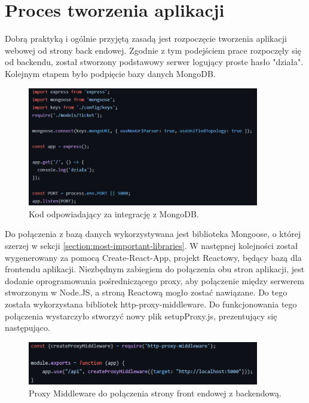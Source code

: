 \documentclass[12pt]{article}
\begin{document}
\begin{sloppypar}
\section{Proces tworzenia aplikacji}
{
  Dobrą praktyką i ogólnie przyjętą zasadą jest rozpoczęcie tworzenia aplikacji webowej od strony back endowej. Zgodnie z tym podejściem prace rozpoczęły się od backendu, 
  został stworzony podstawowy serwer logujący proste hasło "działa". Kolejnym etapem było podpięcie bazy danych MongoDB.
  \begin{figure}[H]
    \centering
    \includegraphics[width=0.9\textwidth]{Creation_process/DB_connected.PNG}
    \caption{Kod odpowiadający za integrację z MongoDB.}
    \label{fig:MongoDB-integration}
  \end{figure}
  Do połączenia z bazą danych wykorzystywana jest biblioteka Mongoose, o której szerzej w sekcji \ref{section:most-important-libraries}.
  W następnej kolejności został wygenerowany za pomocą Create-React-App, projekt Reactowy, będący bazą dla frontendu aplikacji. 
  Niezbędnym zabiegiem do połączenia obu stron aplikacji, jest dodanie oprogramowania pośredniczącego proxy, aby połączenie między serwerem stworzonym w Node.JS, a 
  stroną Reactową mogło zostać nawiązane. Do tego została wykorzystana bibliotek http-proxy-middleware. Do funkcjonowania tego połączenia wystarczyło stworzyć nowy plik 
  setupProxy.js, prezentujący się następująco.
  \begin{figure}[H]
    \centering
    \includegraphics[width=0.9\textwidth]{Creation_process/Proxy_middleware.PNG}
    \caption{Proxy Middleware do połączenia strony front endowej z backendową.}
    \label{fig:proxy-middleware}
  \end{figure}
}
\end{sloppypar}
\end{document}

